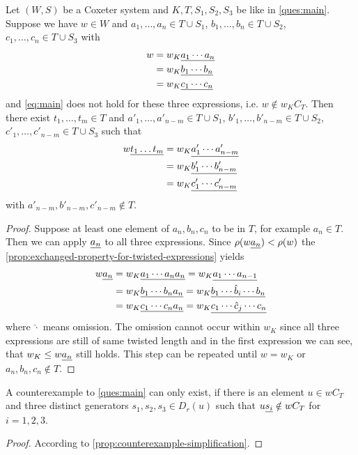 \begin{prop}
	Let $(W,S)$ be a Coxeter system and $K,T,S_1,S_2,S_3$ be like in \ref{ques:main}. Suppose we have $w \in W$ and $a_1,\ldots,a_n \in T \cup S_1$, $b_1,\ldots,b_n \in T \cup S_2$, $c_1,\ldots,c_n \in T \cup S_3$ with
	\begin{align*}
	w & = w_K \underline{ a_1 \cdots a_n } \\
	  & = w_K \underline{ b_1 \cdots b_n } \\
	  & = w_K \underline{ c_1 \cdots c_n }
	\end{align*}
	and \eqref{eq:main} does not hold for these three expressions, i.e. $w \notin w_K C_T$. Then there exist $t_1,\ldots,t_m \in T$ and $a'_1,\ldots,a'_{n-m} \in T \cup S_1$, $b'_1,\ldots,b'_{n-m} \in T \cup S_2$, $c'_1,\ldots,c'_{n-m} \in T \cup S_3$ such that
	\begin{align*}
		w \underline{t_1 \ldots t_m} & = w_K \underline{ a'_1 \cdots a'_{n-m} } \\
							   & = w_K \underline{ b'_1 \cdots b'_{n-m} } \\
							   & = w_K \underline{ c'_1 \cdots c'_{n-m} }
	\end{align*}
	with $a'_{n-m},b'_{n-m},c'_{n-m} \notin T$.

	\begin{proof}
		Suppose at least one element of $a_n,b_n,c_n$ to be in $T$, for example $a_n \in T$. Then we can apply $\underline{a_n}$ to all three expressions. Since $\rho (w \underline{a_n}) < \rho(w)$ the \ref{prop:exchanged-property-for-twisted-expressions} yields
		\begin{align*}
			w \underline{a_n} & = w_K \underline{ a_1 \cdots a_n a_n } = w_K \underline{ a_1 \cdots a_{n-1} } \\
					   & = w_K \underline{ b_1 \cdots b_n a_n } = w_K \underline{ b_1 \cdots \hat b_i \cdots b_n } \\
					   & = w_K \underline{ c_1 \cdots c_n a_n } = w_K \underline{ c_1 \cdots \hat c_j \cdots c_n }
		\end{align*}
		where $\hat \cdot$ means omission. The omission cannot occur within $w_K$ since all three expressions are still of same twisted length and in the first expression we can see, that $w_K \leq w \underline{a_n}$ still holds. This step can be repeated until $w = w_K$ or $a_n,b_n,c_n \notin T$.
	\end{proof}
\end{prop}

\begin{lemm}
	A counterexample to \ref{ques:main} can only exist, if there
	is an element $u \in w C_T$ and three distinct generators $s_1,s_2,s_3 \in
	D_r(u)$ such that $u \underline{s_i} \notin w C_T$ for $i=1,2,3$.

	\begin{proof}
		According to \ref{prop:counterexample-simplification}.
	\end{proof}
\end{lemm}


